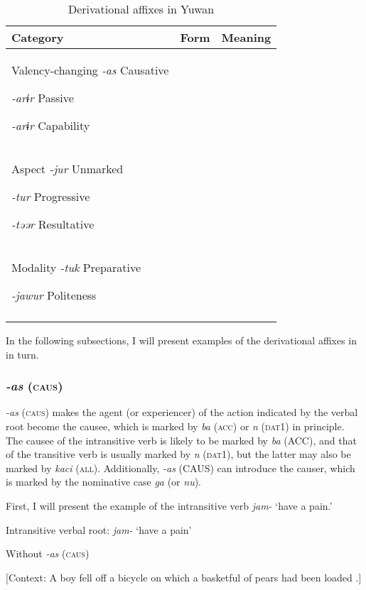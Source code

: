 \begin{table}
\caption{\label{tab:key:84}Derivational affixes in Yuwan}

\begin{tabular}{lll}
\lsptoprule
Category  & Form  & Meaning\\
\midrule
Valency-changing  \textit{-as} Causative

  \textit{-arɨr} Passive

  \textit{-arɨr} Capability\\

\tablevspace
Aspect  \textit{-jur} Unmarked

  \textit{-tur} Progressive

  \textit{-təər} Resultative\\

\tablevspace
Modality  \textit{-tuk} Preparative

  \textit{-jawur} Politeness
 \\
\lspbottomrule
\end{tabular}
\end{table}

In the following subsections, I will present examples of the derivational affixes in  in turn.

\subsubsection{\textit{-as} (\textsc{caus})}

\textit{-as} (\textsc{caus}) makes the agent (or experiencer) of the action indicated by the verbal root become the causee, which is marked by \textit{ba} (\textsc{acc}) or \textit{n} (\textsc{dat1}) in principle. The causee of the intransitive verb is likely to be marked by \textit{ba} (ACC), and that of the transitive verb is usually marked by \textit{n} (\textsc{dat1}), but the latter may also be marked by \textit{kaci} (\textsc{all}). Additionally, \textit{-as} (CAUS) can introduce the causer, which is marked by the nominative case \textit{ga} (or \textit{nu}).

  First, I will present the example of the intransitive verb \textit{jam-} ‘have a pain.’

\ea\label{ex:8-119}
  Intransitive verbal root: \textit{jam-} ‘have a pain’

\ea Without \textit{-as} (\textsc{caus})

  [Context: A boy fell off a bicycle on which a basketful of pears had been loaded .]


